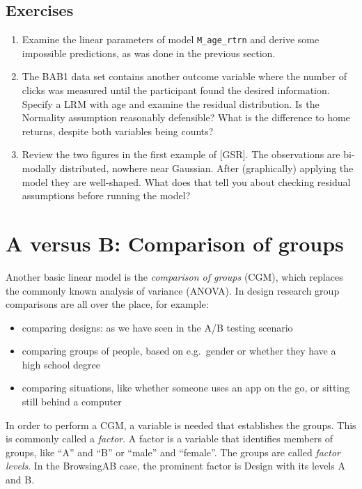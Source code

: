 \documentclass[]{svmono}
\providecommand{\tightlist}{%
  \setlength{\itemsep}{0pt}\setlength{\parskip}{0pt}}
\begin{document}
\subsection{Exercises}\label{exercises-2}

\begin{enumerate}
\def\labelenumi{\arabic{enumi}.}
\item
  Examine the linear parameters of model \texttt{M\_age\_rtrn} and
  derive some impossible predictions, as was done in the previous
  section.
\item
  The BAB1 data set contains another outcome variable where the number
  of clicks was measured until the participant found the desired
  information. Specify a LRM with age and examine the residual
  distribution. Is the Normality assumption reasonably defensible? What
  is the difference to home returns, despite both variables being
  counts?
\item
  Review the two figures in the first example of {[}GSR{]}. The
  observations are bi-modally distributed, nowhere near Gaussian. After
  (graphically) applying the model they are well-shaped. What does that
  tell you about checking residual assumptions before running the model?
\end{enumerate}

\section{A versus B: Comparison of groups}\label{CGM}

Another basic linear model is the \emph{comparison of groups} (CGM),
which replaces the commonly known analysis of variance (ANOVA). In
design research group comparisons are all over the place, for example:

\begin{itemize}
\tightlist
\item
  comparing designs: as we have seen in the A/B testing scenario
\item
  comparing groups of people, based on e.g.~gender or whether they have
  a high school degree
\item
  comparing situations, like whether someone uses an app on the go, or
  sitting still behind a computer
\end{itemize}

In order to perform a CGM, a variable is needed that establishes the
groups. This is commonly called a \emph{factor}. A factor is a variable
that identifies members of groups, like ``A'' and ``B'' or ``male'' and
``female''. The groups are called \emph{factor levels}. In the
BrowsingAB case, the prominent factor is Design with its levels A and B.
\end{document}
